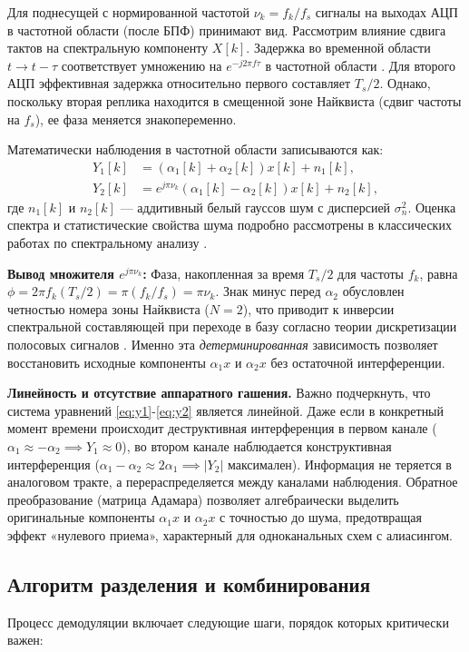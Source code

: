 \documentclass[a4paper,12pt]{article}
\numberwithin{equation}{section}
\begin{document}
Для поднесущей с нормированной частотой $\nu_k = f_k / f_s$ сигналы на выходах АЦП в частотной области (после БПФ) принимают вид. Рассмотрим влияние сдвига тактов на спектральную компоненту $X[k]$. Задержка во временной области $t \to t - \tau$ соответствует умножению на $e^{-j 2 \pi f \tau}$ в частотной области \cite{oppenheim}. Для второго АЦП эффективная задержка относительно первого составляет $T_s/2$. Однако, поскольку вторая реплика находится в смещенной зоне Найквиста (сдвиг частоты на $f_s$), ее фаза меняется знакопеременно.

Математически наблюдения в частотной области записываются как:
\begin{align}
Y_1[k] &= \left( \alpha_1[k] + \alpha_2[k] \right) x[k] + n_1[k], \label{eq:y1} \\
Y_2[k] &= e^{j \pi \nu_k} \left( \alpha_1[k] - \alpha_2[k] \right) x[k] + n_2[k], \label{eq:y2}
\end{align}
где $n_1[k]$ и $n_2[k]$ — аддитивный белый гауссов шум с дисперсией $\sigma_n^2$. Оценка спектра и статистические свойства шума подробно рассмотрены в классических работах по спектральному анализу \cite{black}.

\textbf{Вывод множителя $e^{j \pi \nu_k}$:}
Фаза, накопленная за время $T_s/2$ для частоты $f_k$, равна $\phi = 2 \pi f_k (T_s/2) = \pi (f_k/f_s) = \pi \nu_k$. Знак минус перед $\alpha_2$ обусловлен четностью номера зоны Найквиста ($N=2$), что приводит к инверсии спектральной составляющей при переходе в базу согласно теории дискретизации полосовых сигналов \cite{vaughan}. Именно эта \textit{детерминированная} зависимость позволяет восстановить исходные компоненты $\alpha_1 x$ и $\alpha_2 x$ без остаточной интерференции.

\textbf{Линейность и отсутствие аппаратного гашения.} Важно подчеркнуть, что система уравнений \eqref{eq:y1}-\eqref{eq:y2} является линейной. Даже если в конкретный момент времени происходит деструктивная интерференция в первом канале ($\alpha_1 \approx -\alpha_2 \implies Y_1 \approx 0$), во втором канале наблюдается конструктивная интерференция ($\alpha_1 - \alpha_2 \approx 2\alpha_1 \implies |Y_2|$ максимален). Информация не теряется в аналоговом тракте, а перераспределяется между каналами наблюдения. Обратное преобразование (матрица Адамара) позволяет алгебраически выделить оригинальные компоненты $\alpha_1 x$ и $\alpha_2 x$ с точностью до шума, предотвращая эффект «нулевого приема», характерный для одноканальных схем с алиасингом.

\subsection{Алгоритм разделения и комбинирования}
Процесс демодуляции включает следующие шаги, порядок которых критически важен:
\end{document}
